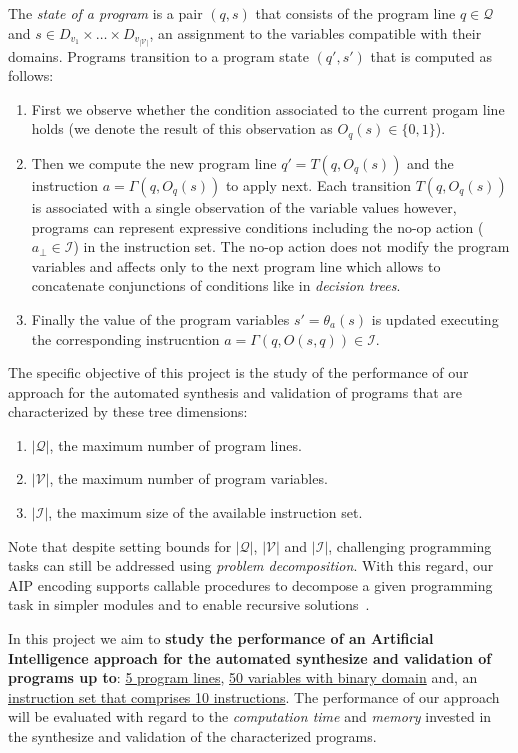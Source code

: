 \documentclass[10pt,a4paper]{paper}
\begin{document}
The {\em state of a program} is a pair $(q,s)$ that consists of the program line $q\in \mathcal{Q}$ and $s\in D_{v_1}\times \ldots \times D_{v_{|\mathcal{V}|}}$, an assignment to the variables compatible with their domains. Programs transition to a program state $(q',s')$ that is computed as follows:
\begin{enumerate}
\item First we observe whether the condition associated to the current progam line holds (we denote the result of this observation as $O_q(s)\in \{0,1\}$). 
\item Then we compute the new program line $q'=T(q,O_q(s))$ and the instruction $a=\Gamma(q,O_q(s))$ to apply next. Each transition $T(q,O_q(s))$ is associated with a single observation of the variable values however, programs can represent expressive conditions including the no-op action ($a_{\bot}\in\mathcal{I}$) in the instruction set. The no-op action does not modify the program variables and affects only to the next program line which allows to concatenate conjunctions of conditions like in {\em decision trees}.
\item Finally the value of the program variables $s'=\theta_a(s)$ is updated executing the corresponding instrucntion $a=\Gamma(q,O(s,q))\in \mathcal{I}$.
\end{enumerate}
 
The specific objective of this project is the study of the performance of our approach for the automated synthesis and validation of programs that are characterized by these tree dimensions:
\begin{enumerate}
\item $|\mathcal{Q}|$, the maximum number of program lines.
\item $|\mathcal{V}|$, the maximum number of program variables. 
\item $|\mathcal{I}|$, the maximum size of the available instruction set.  
\end{enumerate}
Note that despite setting bounds for $|\mathcal{Q}|$, $|\mathcal{V}|$ and $|\mathcal{I}|$, challenging programming tasks can still be addressed using {\em problem decomposition}. With this regard, our AIP encoding supports callable procedures to decompose a given programming task in simpler modules and to enable recursive solutions~\cite{sergio:aprograming:icaps16,sergio:aprograming:ijcai16}.

In this project we aim to {\bf study the performance of an Artificial Intelligence approach for the automated synthesize and validation of programs up to}: \underline{5 program lines}, \underline{50 variables with binary domain} and, an \\\underline{instruction set that comprises 10 instructions}. The performance of our approach will be evaluated with regard to the {\em computation time} and {\em memory} invested in the synthesize and validation of the characterized programs.
\end{document}
